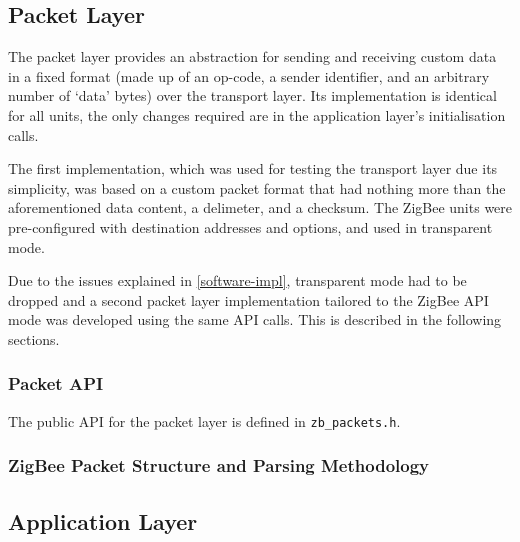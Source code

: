 \subsection{Packet Layer}
The packet layer provides an abstraction for sending and receiving custom data in a fixed format (made up of an op-code, a sender identifier, and an arbitrary number of `data' bytes) over the transport layer. Its implementation is identical for all units, the only changes required are in the application layer's initialisation calls.

The first implementation, which was used for testing the transport layer due its simplicity, was based on a custom packet format that had nothing more than the aforementioned data content, a delimeter, and a checksum. The ZigBee units were pre-configured with destination addresses and options, and used in transparent mode.

Due to the issues explained in \ref{software-impl}, transparent mode had to be dropped and a second packet layer implementation tailored to the ZigBee API mode was developed using the same API calls. This is described in the following sections.

\subsubsection{Packet API}
The public API for the packet layer is defined in \texttt{zb\_packets.h}.

\subsubsection{ZigBee Packet Structure and Parsing Methodology}


\subsection{Application Layer}
